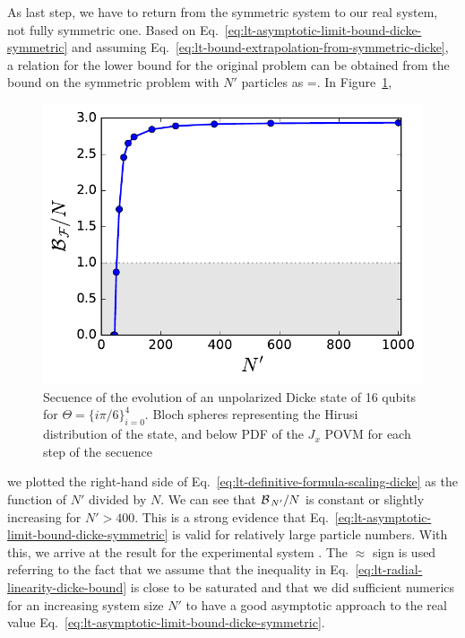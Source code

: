 As last step, we have to return from the symmetric system to our real system, not fully symmetric one.
Based on Eq.~\eqref{eq:lt-asymptotic-limit-bound-dicke-symmetric} and assuming Eq.~\eqref{eq:lt-bound-extrapolation-from-symmetric-dicke}, a relation for the lower bound for the original problem can be obtained from the bound on the symmetric problem with $N'$ particles as
\be
  \label{eq:lt-definitive-formula-scaling-dicke}
  \approx {}  =.
\ee
In Figure~\ref{fig:assimpthotic-approach-to-the-bound-from-scaled-dicke},
\begin{figure}
  \centering
  \includegraphics[scale=.65]{img/plots/LT_dicke_7900_asymp.pdf}
  \caption[Asymptotic behaviour of the bound for increasing size systems for Dicke like experimental data]{Secuence of the evolution of an unpolarized Dicke state of 16 qubits for $\Theta=\{i\pi/6\}_{i=0}^4$. Bloch spheres representing the Hirusi distribution of the state, and below PDF of the $J_x$ POVM for each step of the secuence}
  \label{fig:assimpthotic-approach-to-the-bound-from-scaled-dicke}
\end{figure}
we plotted the right-hand side of Eq.~\eqref{eq:lt-definitive-formula-scaling-dicke} as the function of $N'$ divided by $N$.
We can see that $\mathcal{B}_{\, N' }/N$ is constant or slightly increasing for $N'>400$.
This is a strong evidence that Eq.~\eqref{eq:lt-asymptotic-limit-bound-dicke-symmetric} is valid for relatively large particle numbers.
With this, we arrive at the result for the experimental system
\be
  \label{eq:lt-result-experimental-dicke}
  .
\ee
The $\approx$ sign is used referring to the fact that we assume that the inequality in Eq.~\eqref{eq:lt-radial-linearity-dicke-bound} is close to be saturated and that we did sufficient numerics for an increasing system size $N'$ to have a good asymptotic approach to the real value Eq.~\eqref{eq:lt-asymptotic-limit-bound-dicke-symmetric}.

